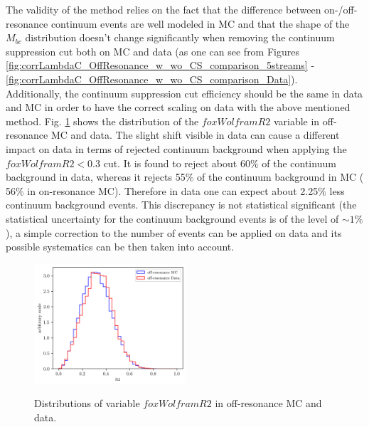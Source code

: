 \noindent The validity of the method relies on the fact that the difference between  on-/off-resonance continuum events are well modeled in MC and that the shape of the $M_{bc}$ distribution doesn't change significantly when removing the continuum suppression cut both on MC and data (as one can see from Figures \ref{fig:corrLambdaC_OffResonance_w_wo_CS_comparison_5streams} - \ref{fig:corrLambdaC_OffResonance_w_wo_CS_comparison_Data}).\\
Additionally, the continuum suppression cut efficiency should be the same in data and MC in order to have the correct scaling on data with the above mentioned method. Fig. \ref{fig:R2_MC-Data_off_resonance_distributions} shows the distribution of the $foxWolframR2$ variable in off-resonance MC and data. The slight shift visible in data can cause a different impact on data in terms of rejected continuum background when applying the $foxWolframR2 < 0.3$ cut. It is found to reject about 60$\%$ of the continuum background in data, whereas it rejects 55$\%$ of the continuum background in MC ( 56$\%$ in on-resonance MC). Therefore in data one can expect about 2.25$\%$ less continuum background events. This discrepancy is not statistical significant (the statistical uncertainty for the continuum background events is of the level of $\sim 1\%$),  a simple correction to the number of events can be applied on data and its possible systematics can be then taken into account.%





\begin{figure}[H]
{\includegraphics[width=0.5\textwidth]{04-chargedCorrBtoLambda/figs/R2_MC-Data_off_resonance_distributions.png}}
\caption{Distributions of variable $foxWolframR2$ in off-resonance MC and data.}
\label{fig:R2_MC-Data_off_resonance_distributions}
\end{figure}





